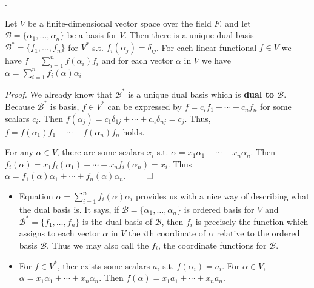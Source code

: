 \documentclass[8pt]{beamer}
\newcommand{\mc}[1]{\mathcal{#1}}
\newcommand{\tb}[1]{\textbf{#1}}
\newcommand{\ti}[1]{\textit{#1}}
\begin{document}
\begin{frame}{.}
    \begin{theorem}
        Let $V$ be a finite-dimensional vector space over the field $F$, and let $\mc{B} =\{\alpha_1, \dots, \alpha_n\}$ be a basis for $V$.
        Then there is a unique dual basis $\mc{B}^\ast = \{f_1, \dots, f_n \}$ for $V^\ast$ s.t. $f_i ( \alpha_j ) = \delta_{ij}$.
        For each linear functional $f \in V$ we have $f = \sum_{i=1}^n f(\alpha_i) f_i$ and for each vector $\alpha$ in $V$ we have $\alpha = \sum_{i=1}^n f_i (\alpha) \alpha_i$
    \end{theorem}

    \ti{Proof.}
    We already know that $\mc{B}^\ast$ is a unique dual basis which is \tb{dual to $\mc{B}$}.
    Because $\mc{B}^\ast$ is basis, $f \in V^\ast$ can be expressed by $f = c_i f_1 + \cdots + c_n f_n$ for some scalars $c_i$.
    Then $f(\alpha_j) = c_1 \delta_{1j} + \cdots + c_n \delta_{nj} = c_j$.
    Thus, $f = f(\alpha_1)f_1 + \cdots + f(\alpha_n) f_n$ holds.

    \smallskip
    For any $\alpha \in V$, there are some scalars $x_i$ s.t. $\alpha = x_1 \alpha_1 + \cdots + x_n \alpha_n$.
    Then $f_i(\alpha) = x_1 f_i (\alpha_1) + \cdots + x_n f_i (\alpha_n) = x_i$.
    Thus $\alpha = f_1(\alpha) \alpha_1 + \cdots + f_n (\alpha) \alpha_n$.
    $\qed$

    \bigskip
    \begin{itemize}
        \item Equation $\alpha = \sum_{i=1}^n f_i (\alpha) \alpha_i$ provides us with a nice way of describing what the dual basis is.
        It says, if $\mc{B} = \{\alpha_1, \dots, \alpha_n \}$ is ordered basis for $V$ and $\mc{B}^\ast = \{f_1, \dots, f_n \}$ is the dual basis of $\mc{B}$, then $f_i$ is precisely the function which assigns to each vector $\alpha$ in $V$ the $i$th coordinate of $\alpha$ relative to the ordered basis $\mc{B}$. Thus we may also call the $f_i$, the coordinate functions for $\mc{B}$.
        \item For $f \in V^\ast$, ther exists some scalars $a_i$ s.t. $f(\alpha_i) = a_i$.
        For $\alpha \in V$, $\alpha = x_1 \alpha_1 + \cdots + x_n \alpha_n$.
        Then $f(\alpha) = x_1 a_1 + \cdots + x_n a_n$.
    \end{itemize}
\end{frame}
\end{document}
